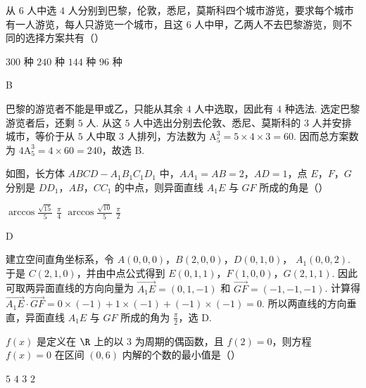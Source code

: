 \begin{problem}
从 \(6\) 人中选 \(4\) 人分别到巴黎，伦敦，悉尼，莫斯科四个城市游览，要求每个城市有一人游览，每人只游览一个城市，且这 \(6\) 人中甲，乙两人不去巴黎游览，则不同的选择方案共有（\quad）

\choices
    {\(300\) 种}
    {\(240\) 种}
    {\(144\) 种}
    {\(96\) 种}
\end{problem}

\begin{answer}
B
\end{answer}

\begin{solution}
巴黎的游览者不能是甲或乙，只能从其余 \(4\) 人中选取，因此有 \(4\) 种选法.
选定巴黎游览者后，还剩 \(5\) 人. 从这 \(5\) 人中选出分别去伦敦、悉尼、莫斯科的
\(3\) 人并安排城市，等价于从 \(5\) 人中取 \(3\) 人排列，方法数为
\(\mathrm A_{5}^{3}=5\times4\times3=60\). 因而总方案数为
\(4\mathrm A_{5}^{3}=4\times60=240\)，故选 B.
\end{solution}

\begin{problem}
如图，长方体 \(ABCD - A_{1}B_{1}C_{1}D_{1}\) 中，\(AA_{1} = AB = 2\)，\(AD = 1\)，点 \(E\)，\(F\)，\(G\) 分别是 \(DD_{1}\)，\(AB\)，\(CC_{1}\) 的中点，则异面直线 \(A_{1}E\) 与 \(GF\) 所成的角是（\quad）


\choices
    {\(\arccos \frac{\sqrt{15}}{5}\)}
    {\(\frac{\pi}{4}\)}
    {\(\arccos \frac{\sqrt{10}}{5}\)}
    {\(\frac{\pi}{2}\)}
\end{problem}

\begin{answer}
D
\end{answer}

\begin{solution}
建立空间直角坐标系，令 \(A(0,0,0)\)，\(B(2,0,0)\)，\(D(0,1,0)\)，
\(A_{1}(0,0,2)\). 于是 \(C(2,1,0)\)，并由中点公式得到
\(E(0,1,1)\)，\(F(1,0,0)\)，\(G(2,1,1)\).
因此可取两异面直线的方向向量为
\(\overrightarrow{A_{1}E}=(0,1,-1)\) 和 \(\overrightarrow{GF}=(-1,-1,-1)\). 计算得
\(\overrightarrow{A_{1}E}\cdot\overrightarrow{GF}=0\times(-1)+1\times(-1)+(-1)\times(-1)=0\).
所以两直线的方向垂直，异面直线 \(A_{1}E\) 与 \(GF\) 所成的角为
\(\frac{\pi}{2}\)，选 D.
\end{solution}

\begin{problem}
\(f(x)\) 是定义在 \(\R\) 上的以 \(3\) 为周期的偶函数，且 \(f(2) = 0\)，则方程 \(f(x) = 0\) 在区间 \((0,6)\) 内解的个数的最小值是（\quad）

\choices
    {\(5\)}
    {\(4\)}
    {\(3\)}
    {\(2\)}
\end{problem}

